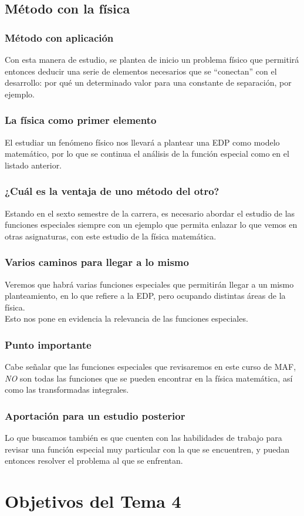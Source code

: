 \subsection{Método con la física}
\begin{frame}
\frametitle{Método con aplicación}
Con esta manera de estudio, se plantea de inicio un problema físico que permitirá entonces deducir una serie de elementos necesarios que se \enquote{conectan} con el desarrollo: por qué un determinado valor para una constante de separación, por ejemplo.
\end{frame}
\begin{frame}
\frametitle{La física como primer elemento}
El estudiar un fenómeno físico nos llevará a plantear una EDP como modelo matemático, por lo que se continua el análisis de la función especial como en el listado anterior.
\end{frame}
\begin{frame}
\frametitle{¿Cuál es la ventaja de uno método del otro?}
Estando en el sexto semestre de la carrera, es necesario abordar el estudio de las funciones especiales siempre con un ejemplo que permita enlazar lo que vemos en otras asignaturas, con este estudio de la física matemática.
\end{frame}
\begin{frame}
\frametitle{Varios caminos para llegar a lo mismo}
Veremos que habrá varias funciones especiales que permitirán llegar a un mismo planteamiento, en lo que refiere a la EDP, pero ocupando distintas áreas de la física.
\\
\bigskip
\pause
Esto nos pone en evidencia la relevancia de las funciones especiales.
\end{frame}
\begin{frame}
\frametitle{Punto importante}
Cabe señalar que las funciones especiales que revisaremos en este curso de MAF, \emph{NO} son todas las funciones que se pueden encontrar en la física matemática, así como las transformadas integrales.
\end{frame}
\begin{frame}
\frametitle{Aportación para un estudio posterior}
Lo que buscamos también es que cuenten con las habilidades de trabajo para revisar una función especial muy particular con la que se encuentren, y puedan entonces resolver el problema al que se enfrentan.
\end{frame}
\section{Objetivos del Tema 4}
